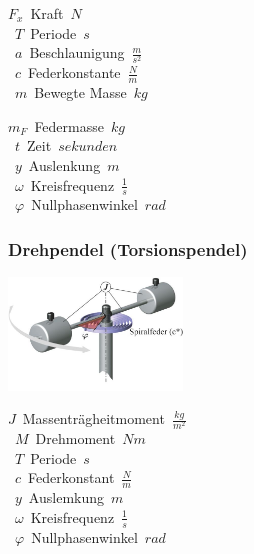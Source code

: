 
\begin{center}
	\begin{minipage}{0.3\textwidth}
		\unit{$F_x$}{Kraft}{$N$} \\
		\unit{$T$}{Periode}{$s$} \\
		\unit{$a$}{Beschlaunigung}{$\frac{m}{s^2}$} \\
		\unit{$c$}{Federkonstante}{$\frac{N}{m}$} \\
		\unit{$m$}{Bewegte Masse}{$kg$}
	\end{minipage}%
	\begin{minipage}{0.3\textwidth}
		\unit{$m_F$}{Federmasse}{$kg$} \\
		\unit{$t$}{Zeit}{$sekunden$} \\
		\unit{$y$}{Auslenkung}{$m$} \\
		\unit{$\omega$}{Kreisfrequenz}{$\frac{1}{s}$} \\
		\unit{$\varphi$}{Nullphasenwinkel}{$rad$}
	\end{minipage}
\end{center}





\subsubsection{Drehpendel (Torsionspendel)}

\begin{center}
	\begin{minipage}{0.3\textwidth}
	\end{minipage}%
	\begin{minipage}{0.3\textwidth}
		\includegraphics[height=3cm,keepaspectratio=true]{Images/drehpendel.png}
	\end{minipage}
\end{center}
\unit{$J$}{Massenträgheitmoment}{$\frac{kg}{m^2}$} \\
\unit{$M$}{Drehmoment}{$N m$} \\
\unit{$T$}{Periode}{$s$} \\
\unit{$c$}{Federkonstant}{$\frac{N}{m}$} \\
\unit{$y$}{Auslemkung}{$m$} \\
\unit{$\omega$}{Kreisfrequenz}{$\frac{1}{s}$} \\
\unit{$\varphi$}{Nullphasenwinkel}{$rad$}




